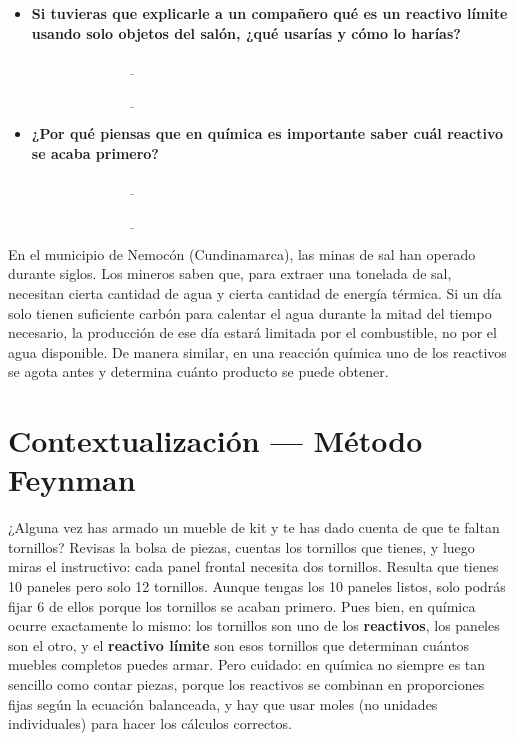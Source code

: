 \documentclass[
  spanish,
  letterpaper,
  12pt,
  oneside,
  open=any]{scrbook}
\newcommand{\setcolorsection}[2]{%
  \definecolor{currentsectionbg}{HTML}{#1}%
  \definecolor{currentsectionborder}{HTML}{#2}%
}
\begin{document}
\begin{itemize}
  \(\underline{\hspace{6cm}}\)

  \(\underline{\hspace{6cm}}\)
\item
  \textbf{Si tuvieras que explicarle a un compañero qué es un reactivo
  límite usando solo objetos del salón, ¿qué usarías y cómo lo harías?}

  \(\underline{\hspace{6cm}}\)

  \(\underline{\hspace{6cm}}\)
\item
  \textbf{¿Por qué piensas que en química es importante saber cuál
  reactivo se acaba primero?}

  \(\underline{\hspace{6cm}}\)

  \(\underline{\hspace{6cm}}\)
\end{itemize}

En el municipio de Nemocón (Cundinamarca), las minas de sal han operado
durante siglos. Los mineros saben que, para extraer una tonelada de sal,
necesitan cierta cantidad de agua y cierta cantidad de energía térmica.
Si un día solo tienen suficiente carbón para calentar el agua durante la
mitad del tiempo necesario, la producción de ese día estará limitada por
el combustible, no por el agua disponible. De manera similar, en una
reacción química uno de los reactivos se agota antes y determina cuánto
producto se puede obtener.

\setcolorsection{f2c6a0}{e0b088}

\section{Contextualización --- Método
Feynman}\label{contextualizaciuxf3n-muxe9todo-feynman}

¿Alguna vez has armado un mueble de kit y te has dado cuenta de que te
faltan tornillos? Revisas la bolsa de piezas, cuentas los tornillos que
tienes, y luego miras el instructivo: cada panel frontal necesita dos
tornillos. Resulta que tienes 10 paneles pero solo 12 tornillos. Aunque
tengas los 10 paneles listos, solo podrás fijar 6 de ellos porque los
tornillos se acaban primero. Pues bien, en química ocurre exactamente lo
mismo: los tornillos son uno de los \textbf{reactivos}, los paneles son
el otro, y el \textbf{reactivo límite} son esos tornillos que determinan
cuántos muebles completos puedes armar. Pero cuidado: en química no
siempre es tan sencillo como contar piezas, porque los reactivos se
combinan en proporciones fijas según la ecuación balanceada, y hay que
usar moles (no unidades individuales) para hacer los cálculos correctos.
\end{document}
